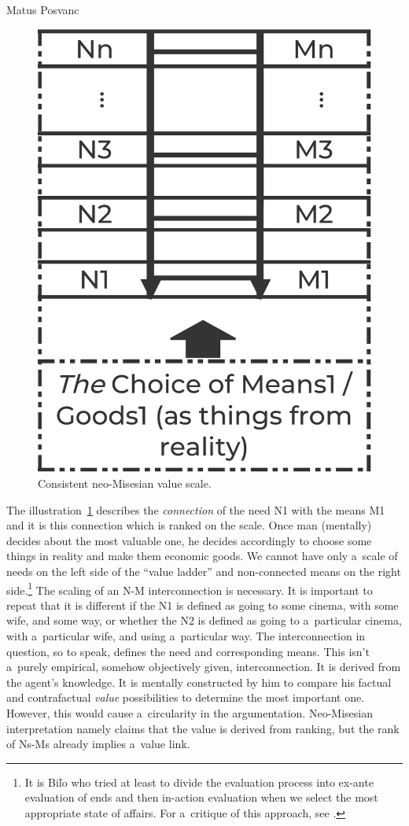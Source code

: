 \begin{artengenv}{Matus Posvanc}
\begin{figure}
 \begin{center}
 \includegraphics[width=.35\textwidth]{ART_Posvanc/Illustration1_PU.pdf}%
 \end{center}%
 \caption{Consistent neo-Misesian value scale.}\label{pos:fig1}
\end{figure}




The illustration~\ref{pos:fig1} describes the \textit{connection} of the need N1 with the means M1 and it is this connection which is ranked on the scale. Once man (mentally) decides about the most valuable one, he decides accordingly to choose some things in reality and make them economic goods. We cannot have only a~scale of needs on the left side of the ``value ladder'' and non-connected means on the right side.\footnote{It is Biľo 
\parencite*[][]{Bilo2004Theory} %
 who tried at least to divide the evaluation process into ex-ante evaluation of ends and then in-action evaluation when we select the most appropriate state of affairs. For a~critique of this approach, see 
\parencite[][]{Posvanc2019Evolutionary}.%
} The scaling of an N-M interconnection is necessary. It is important to repeat that it is different if the N1 is defined as going to some cinema, with some wife, and some way, or whether the N2 is defined as going to a~particular cinema, with a~particular wife, and using a~particular way. The interconnection in question, so to speak, defines the need and corresponding means. This isn't a~purely empirical, somehow objectively given, interconnection. It is derived from the agent's knowledge. It is mentally constructed by him to compare his factual and contrafactual \textit{value} possibilities to determine the most important one. However, this would cause a~circularity in the argumentation. Neo-Misesian interpretation namely claims that the value is derived from ranking, but the rank of Ns-Ms already implies a~value link.




\end{artengenv}
